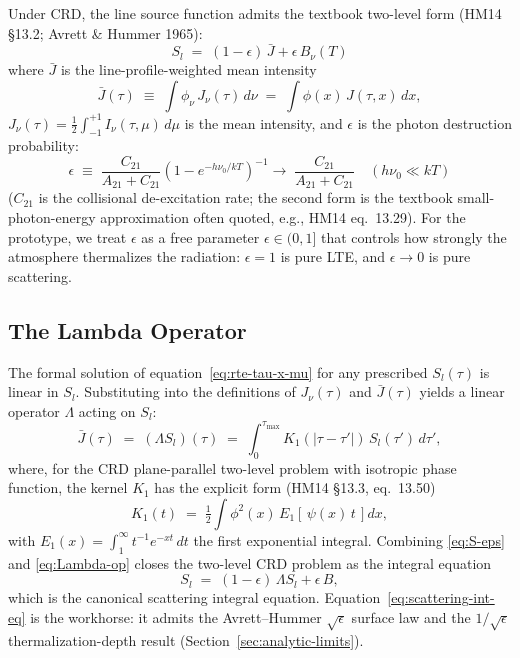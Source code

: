 \documentclass[11pt]{article}
\newcommand{\Lop}{\Lambda}
\newcommand{\Jbar}{\bar{J}}
\newcommand{\half}{\tfrac{1}{2}}
\begin{document}
Under CRD, the line source function admits the textbook two-level form
(HM14 §13.2; Avrett \& Hummer 1965):
\begin{equation}
\boxed{\; S_l \;=\; (1 - \epsilon)\,\Jbar + \epsilon\,B_\nu(T) \;}
\label{eq:S-eps}
\end{equation}
where $\Jbar$ is the line-profile-weighted mean intensity
\begin{equation}
\Jbar(\tau) \;\equiv\; \int \phi_\nu \, J_\nu(\tau)\, d\nu
\;=\; \int \phi(x)\, J(\tau, x)\, dx ,
\label{eq:Jbar}
\end{equation}
$J_\nu(\tau) = \tfrac{1}{2}\int_{-1}^{+1} I_\nu(\tau,\mu)\, d\mu$ is the
mean intensity, and $\epsilon$ is the photon destruction probability:
\begin{equation}
\epsilon \;\equiv\; \frac{C_{21}}{A_{21} + C_{21}}\!\left(1 - e^{-h\nu_0/kT}\right)^{-1}
\!\!\to\; \frac{C_{21}}{A_{21} + C_{21}}\quad(h\nu_0\!\ll\!kT)
\label{eq:eps}
\end{equation}
($C_{21}$ is the collisional de-excitation rate; the second form is the
textbook small-photon-energy approximation often quoted, e.g.,
HM14 eq.~13.29).  For the prototype, we treat $\epsilon$ as a free
parameter $\epsilon \in (0, 1]$ that controls how strongly the
atmosphere thermalizes the radiation: $\epsilon = 1$ is pure LTE, and
$\epsilon \to 0$ is pure scattering.

\subsection{The Lambda Operator}

The formal solution of equation~\eqref{eq:rte-tau-x-mu} for any prescribed
$S_l(\tau)$ is linear in $S_l$. Substituting into the definitions of
$J_\nu(\tau)$ and $\Jbar(\tau)$ yields a linear operator $\Lop$ acting on
$S_l$:
\begin{equation}
\Jbar(\tau) \;=\; (\Lop S_l)(\tau) \;=\; \int_0^{\tau_{\max}} K_1(|\tau - \tau'|)\, S_l(\tau')\, d\tau' ,
\label{eq:Lambda-op}
\end{equation}
where, for the CRD plane-parallel two-level problem with isotropic phase
function, the kernel $K_1$ has the explicit form (HM14 §13.3, eq.~13.50)
\begin{equation}
K_1(t) \;=\; \half\!\int\!\phi^2(x)\, E_1\!\left[\,\psi(x)\,t\,\right] dx ,
\label{eq:K1}
\end{equation}
with $E_1(x) = \int_1^\infty t^{-1} e^{-xt}\, dt$ the first exponential
integral. Combining \eqref{eq:S-eps} and \eqref{eq:Lambda-op} closes the
two-level CRD problem as the integral equation
\begin{equation}
S_l \;=\; (1-\epsilon)\, \Lop S_l + \epsilon\, B,
\label{eq:scattering-int-eq}
\end{equation}
which is the canonical scattering integral equation.
Equation~\eqref{eq:scattering-int-eq} is the workhorse: it admits the
Avrett--Hummer $\sqrt{\epsilon}$ surface law and the
$1/\sqrt{\epsilon}$ thermalization-depth result
(Section~\ref{sec:analytic-limits}).
\end{document}
